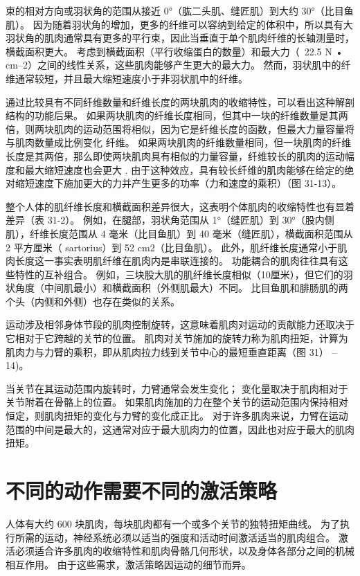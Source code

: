 束的相对方向或羽状角的范围从接近 0°（肱二头肌、缝匠肌）到大约 30°（比目鱼肌）。 因为随着羽状角的增加，更多的纤维可以容纳到给定的体积中，所以具有大羽状角的肌肉通常具有更多的平行束，因此当垂直于单个肌肉纤维的长轴测量时，横截面积更大。 考虑到横截面积（平行收缩蛋白的数量）和最大力（~22.5 N • cm–2）之间的线性关系，这些肌肉能够产生更大的最大力。 然而，羽状肌中的纤维通常较短，并且最大缩短速度小于非羽状肌中的纤维。

通过比较具有不同纤维数量和纤维长度的两块肌肉的收缩特性，可以看出这种解剖结构的功能后果。 如果两块肌肉的纤维长度相同，但其中一块的纤维数量是其两倍，则两块肌肉的运动范围将相似，因为它是纤维长度的函数，但最大力量容量将与肌肉数量成比例变化 纤维。 如果两块肌肉的纤维数量相同，但一块肌肉的纤维长度是其两倍，那么即使两块肌肉具有相似的力量容量，纤维较长的肌肉的运动幅度和最大缩短速度也会更大 . 由于这种效应，具有较长纤维的肌肉能够在给定的绝对缩短速度下施加更大的力并产生更多的功率（力和速度的乘积）（图 31-13）。

整个人体的肌纤维长度和横截面积差异很大，这表明个体肌肉的收缩特性也有显着差异（表 31-2）。 例如，在腿部，羽状角范围从 1°（缝匠肌）到 30°（股内侧肌），纤维长度范围从 4 毫米（比目鱼肌）到 40 毫米（缝匠肌），横截面积范围从 2 平方厘米（ sartorius）到 52 cm2（比目鱼肌）。 此外，肌纤维长度通常小于肌肉长度这一事实表明肌纤维在肌肉内是串联连接的。 功能耦合的肌肉往往具有这些特性的互补组合。 例如，三块股大肌的肌纤维长度相似（10厘米），但它们的羽状角度（中间肌最小）和横截面积（外侧肌最大）不同。 比目鱼肌和腓肠肌的两个头（内侧和外侧）也存在类似的关系。

运动涉及相邻身体节段的肌肉控制旋转，这意味着肌肉对运动的贡献能力还取决于它相对于它跨越的关节的位置。 肌肉对关节施加的旋转力称为肌肉扭矩，计算为肌肉力与力臂的乘积，即从肌肉拉力线到关节中心的最短垂直距离（图 31） –14)。

当关节在其运动范围内旋转时，力臂通常会发生变化； 变化量取决于肌肉相对于关节附着在骨骼上的位置。 如果肌肉施加的力在整个关节的运动范围内保持相对恒定，则肌肉扭矩的变化与力臂的变化成正比。 对于许多肌肉来说，力臂在运动范围的中间是最大的，这通常对应于最大肌肉力的位置，因此也对应于最大的肌肉扭矩。


\section{不同的动作需要不同的激活策略}
人体有大约 600 块肌肉，每块肌肉都有一个或多个关节的独特扭矩曲线。 为了执行所需的运动，神经系统必须以适当的强度和活动时间激活适当的肌肉组合。 激活必须适合许多肌肉的收缩特性和肌肉骨骼几何形状，以及身体各部分之间的机械相互作用。 由于这些需求，激活策略因运动的细节而异。

